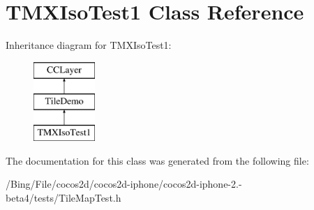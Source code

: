 \hypertarget{interface_t_m_x_iso_test1}{\section{T\-M\-X\-Iso\-Test1 Class Reference}
\label{interface_t_m_x_iso_test1}
}
Inheritance diagram for T\-M\-X\-Iso\-Test1\-:\begin{figure}[H]
\begin{center}
\leavevmode
\includegraphics[height=3.000000cm]{interface_t_m_x_iso_test1}
\end{center}
\end{figure}


The documentation for this class was generated from the following file\-:\begin{DoxyCompactItemize}
\item 
/\-Bing/\-File/cocos2d/cocos2d-\/iphone/cocos2d-\/iphone-\/2.-\/beta4/tests/Tile\-Map\-Test.\-h\end{DoxyCompactItemize}
